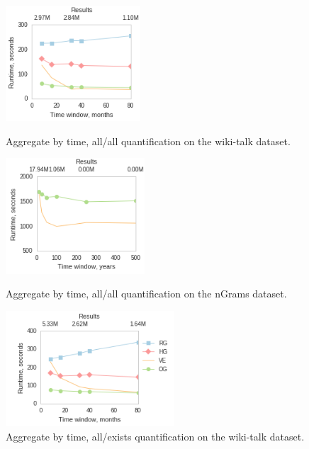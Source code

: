 \begin{figure}[th]
\begin{minipage}{2in}
\centering
\includegraphics[height=1.7in]{figs/agg_allall_wikitalk_vertices_build11_trimmed.png}
\caption{Aggregate by time, all/all quantification on the wiki-talk dataset.}
\label{fig:agg1}
\end{minipage}
\begin{minipage}{2in}
\centering
\includegraphics[height=1.7in]{figs/agg_allall_ngrams_edges_build11_trimmed.png}
\caption{Aggregate by time, all/all quantification on the nGrams dataset.}
\label{fig:agg2}
\end{minipage}
\begin{minipage}{2.6in}
\centering
\includegraphics[height=1.7in]{figs/agg_allexists_wikitalk_edges_build11.png}
\caption{Aggregate by time, all/exists quantification on the wiki-talk dataset.}
\label{fig:agg4}
\end{minipage}
\end{figure}

